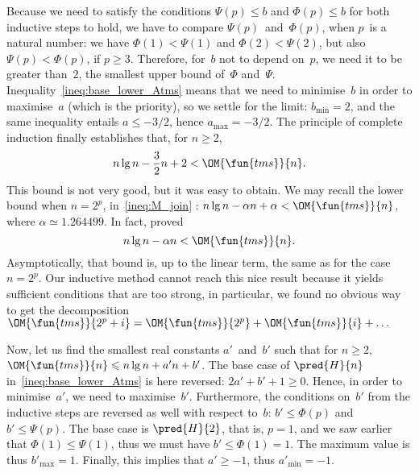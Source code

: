 Because we need to satisfy the conditions \(\Psi(p) \leqslant b\) and
\(\Phi(p) \leqslant b\) for both inductive steps to hold, we have to
compare \(\Psi(p)\)~and~\(\Phi(p)\), when \(p\)~is a natural number:
we have \(\Phi(1) < \Psi(1)\) and \(\Phi(2) < \Psi(2)\), but also
\(\Psi(p) < \Phi(p)\), if \(p \geqslant 3\). Therefore, for~\(b\) not
to depend on~\(p\), we need it to be greater than~\(2\), the smallest
upper bound of~\(\Phi\)
and~\(\Psi\). Inequality~\eqref{ineq:base_lower_Atms} means that we
need to minimise~\(b\) in order to maximise~\(a\) (which is the
priority), so we settle for the limit: \(b_{\min} = 2\), and the same
inequality entails \(a \leqslant -3/2\), hence \(a_{\max} =
-3/2\). The principle of complete induction finally establishes that,
for \(n \geqslant 2\),
\begin{equation}
  n\lg n - \frac{3}{2} n + 2 < \OM{\fun{tms}}{n}.
\label{ineq:lower_Atms}
\end{equation}
This bound is not very good, but it was easy to obtain. We may recall
the lower bound when \(n=2^p\), in~\eqref{ineq:M_join}
: \(n\lg n - \alpha n + \alpha <
\OM{\fun{tms}}{n}\), where \(\alpha \simeq 1.264499\). In fact,
\cite{FlajoletGolin_1994} proved
\begin{equation}
n\lg n - \alpha n < \OM{\fun{tms}}{n}.
\label{ineq:best_lower_Atms}
\end{equation}
Asymptotically, that bound is, up to the linear term, the same as for
the case \(n=2^p\). Our inductive method cannot reach this nice result
because it yields sufficient conditions that are too strong, in
particular, we found no obvious way to get the decomposition
\(\OM{\fun{tms}}{2^p+i} = \OM{\fun{tms}}{2^p} + \OM{\fun{tms}}{i} +
\dots\)

Now, let us find the smallest real constants \(a'\)~and~\(b'\) such
that for \(n \geqslant 2\), \(\OM{\fun{tms}}{n} \leqslant n\lg n + a'n
+ b'\). The base case of \(\pred{H}{n}\)
in~\eqref{ineq:base_lower_Atms} is here reversed: \(2a' + b' + 1
\geqslant 0\). Hence, in order to minimise~\(a'\), we need to
maximise~\(b'\). Furthermore, the conditions on~\(b'\) from the
inductive steps are reversed as well with respect to~\(b\): \(b'
\leqslant \Phi(p)\) and \(b' \leqslant \Psi(p)\). The base case is
\(\pred{H}{2}\), that is, \(p=1\), and we saw earlier that \(\Phi(1)
\leqslant \Psi(1)\), thus we must have \(b'\leqslant \Phi(1) =
1\). The maximum value is thus \(b'_{\max} = 1\). Finally, this
implies that \(a'\geqslant -1\), thus \(a'_{\min} = -1\).

